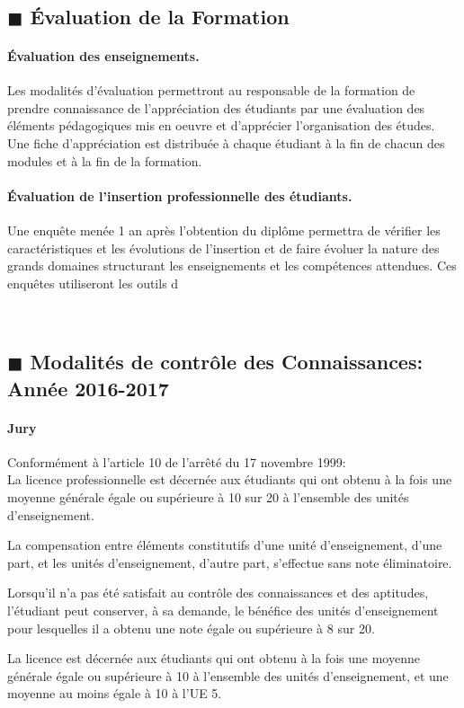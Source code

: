 \documentclass[11pt]{article}
\newcommand{\mysubsection}[1]
{~\\
{\noindent
\begin{minipage}{\linewidth}
\subsection*{$\blacksquare$ #1}
\end{minipage}
}
}
\begin{document}
{{\begin{multicols*}{2}
\mysubsection{Évaluation de la Formation}

\paragraph{Évaluation des enseignements.}
Les modalités d'évaluation permettront au responsable de la formation de prendre connaissance de l'appréciation des étudiants par une évaluation des éléments pédagogiques mis en oeuvre et d'apprécier l'organisation des études. Une fiche d'appréciation est distribuée à chaque étudiant à la fin de chacun des modules et à la fin de la formation.

\paragraph{Évaluation de l'insertion professionnelle des étudiants.}
Une enquête menée 1 an après l'obtention du diplôme permettra de vérifier les caractéristiques et les évolutions de l'insertion et de faire évoluer la nature des grands domaines structurant les enseignements et les compétences attendues.
Ces enquêtes utiliseront les outils d

\newpage

\mysubsection{Modalités de contrôle des Connaissances: Année 2016-2017}

\paragraph{Jury}

Conformément à l'article 10 de l'arrêté du 17 novembre 1999:\\

La licence professionnelle est décernée aux étudiants qui ont obtenu à la fois une moyenne générale égale ou supérieure à 10 sur 20 à l'ensemble des unités d'enseignement.

La compensation entre éléments constitutifs d'une unité d'enseignement, d'une part, et les unités d'enseignement, d'autre part, s'effectue sans note éliminatoire.

Lorsqu'il n'a pas été satisfait au contrôle des connaissances et des aptitudes, l'étudiant peut conserver, à sa demande, le bénéfice des unités d'enseignement pour lesquelles il a obtenu une note égale ou supérieure à 8 sur 20.

La licence est décernée aux étudiants qui ont obtenu à la fois une moyenne générale égale ou supérieure à 10 à l'ensemble des unités d'enseignement, et une moyenne au moins égale à 10 à l'UE 5.


\end{multicols*}}}
\end{document}

